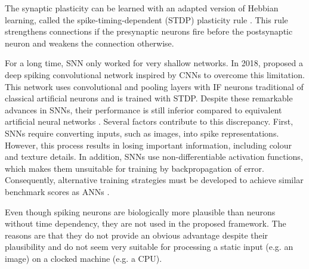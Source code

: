 The synaptic plasticity can be learned with an adapted version of Hebbian learning, called the spike-timing-dependent (STDP) plasticity rule .
This rule strengthens connections if the presynaptic neurons fire before the postsynaptic neuron and weakens the connection otherwise.

For a long time, SNN only worked for very shallow networks.
In 2018,  proposed a deep spiking convolutional network inspired by CNNs to overcome this limitation.
This network uses convolutional and pooling layers with IF neurons traditional of classical artificial neurons and is trained with STDP.
Despite these remarkable advances in SNNs, their performance is still inferior compared to equivalent artificial neural networks . Several factors contribute to this discrepancy. First, SNNs require converting inputs, such as images, into spike representations.
However, this process results in losing important information, including colour and texture details. In addition, SNNs use non-differentiable activation functions, which makes them unsuitable for training by backpropagation of error. Consequently, alternative training strategies must be developed to achieve similar benchmark scores as ANNs \cite{nunes_spiking_2022}.

Even though spiking neurons are biologically more plausible than neurons without time dependency, they are not used in the proposed framework.
The reasons are that they do not provide an obvious advantage despite their plausibility and do not seem very suitable for processing a static input (e.g. an image) on a clocked machine (e.g. a CPU).



